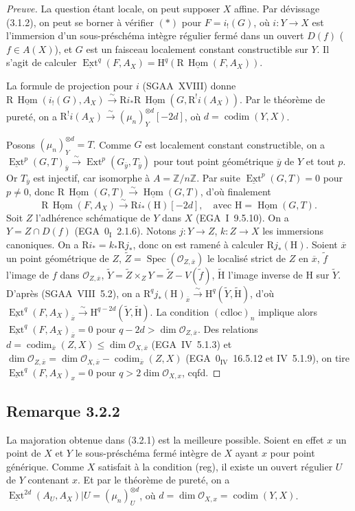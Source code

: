 \documentclass[11pt]{article}
\DeclareMathOperator{\codim}{codim}
\providecommand{\cO}{\mathcal{O}}
\providecommand{\wt}[1]{\widetilde{#1}}
\renewcommand{\H}{\mathrm{H}}
\DeclareMathOperator{\Hom}{Hom}
\DeclareMathOperator{\Ext}{Ext}
\DeclareMathOperator{\Spec}{Spec}
\newcommand{\R}{\mathrm{R}}
\newcommand{\Z}{\mathbb{Z}}
\newcommand{\ol}[1]{\overline{#1}}
\providecommand{\Hom}{\operatorname{Hom}}
\providecommand{\R}{\mathrm R}
\providecommand{\Z}{\mathbb Z}
\providecommand{\Spec}{\operatorname{Spec}}
\providecommand{\Spec}{\operatorname{Spec}}
\providecommand{\Hom}{\operatorname{Hom}}
\providecommand{\Spec}{\operatorname{Spec}}
\providecommand{\Spec}{\operatorname{Spec}}
\begin{document}
\begin{proof}[Preuve]
La question étant locale, on peut supposer $X$ affine. Par dévissage (3.1.2), on peut se borner à vérifier $(*)$ pour $F = i_{!}(G)$, où $i : Y \to X$ est l'immersion d'un sous-préschéma intègre régulier fermé dans un ouvert $D(f)$ ($f \in A(X)$), et $G$ est un faisceau localement constant constructible sur $Y$. Il s'agit de calculer $\underline{\Ext}^q(F, A_X) = \H^q(\R\,\underline{\Hom}(F, A_X))$.

La formule de projection pour $i$ (SGAA~XVIII) donne $\R\,\underline{\Hom}(i_{!}(G), A_X) \xrightarrow{\sim} \R i_{*} \R\,\underline{\Hom}(G, \R^{!}i(A_X))$. Par le théorème de pureté, on a $\R^{!}i(A_X) \xrightarrow{\sim} (\mu_n)^{\otimes d}_Y[-2d]$, où $d = \codim(Y,X)$.

Posons $(\mu_n)^{\otimes d}_Y = T$. Comme $G$ est localement constant constructible, on a $\underline{\Ext}^p(G,T)_{\ol{y}} \xrightarrow{\sim} \Ext^p(G_{\ol{y}}, T_{\ol{y}})$ pour tout point géométrique $\ol{y}$ de $Y$ et tout $p$. Or $T_{\ol{y}}$ est injectif, car isomorphe à $A = \Z/n\Z$. Par suite $\underline{\Ext}^p(G,T) = 0$ pour $p \neq 0$, donc $\R\,\underline{\Hom}(G,T) \xrightarrow{\sim} \underline{\Hom}(G,T)$, d'où finalement
\[
\R\,\underline{\Hom}(F, A_X) \xrightarrow{\sim} \R i_{*}(\H)[-2d], \quad \text{avec } \H = \underline{\Hom}(G,T).
\]
Soit $Z$ l'adhérence schématique de $Y$ dans $X$ (EGA~I~9.5.10). On a $Y = Z \cap D(f)$ (EGA~$0_{\mathrm{I}}$~2.1.6). Notons $j : Y \to Z$, $k : Z \to X$ les immersions canoniques. On a $\R i_{*} = k_{*} \R j_{*}$, donc on est ramené à calculer $\R j_{*}(\H)$. Soient $\ol{x}$ un point géométrique de $Z$, $\wt{Z} = \Spec(\cO_{Z,\ol{x}})$ le localisé strict de $Z$ en $\ol{x}$, $\wt{f}$ l'image de $f$ dans $\cO_{Z,\ol{x}}$, $\wt{Y} = \wt{Z} \times_Z Y = \wt{Z} - V(\wt{f})$, $\wt{\H}$ l'image inverse de $\H$ sur $\wt{Y}$. D'après (SGAA~VIII~5.2), on a $\R^q j_{*}(\H)_{\ol{x}} \xrightarrow{\sim} \H^q(\wt{Y}, \wt{\H})$, d'où $\underline{\Ext}^q(F, A_X)_{\ol{x}} \xrightarrow{\sim} \H^{q-2d}(\wt{Y}, \wt{\H})$. La condition $(\mathrm{cdloc})_n$ implique alors $\underline{\Ext}^q(F, A_X)_{\ol{x}} = 0$ pour $q - 2d > \dim \cO_{Z,\ol{x}}$. Des relations $d = \codim_{\ol{x}}(Z,X) \leqslant \dim \cO_{X,\ol{x}}$ (EGA~IV~5.1.3) et $\dim \cO_{Z,\ol{x}} = \dim \cO_{X,\ol{x}} - \codim_{\ol{x}}(Z,X)$ (EGA~$0_{\mathrm{IV}}$~16.5.12 et IV~5.1.9), on tire $\underline{\Ext}^q(F, A_X)_x = 0$ pour $q > 2\dim \cO_{X,x}$, cqfd.
\end{proof}

\subsection*{Remarque 3.2.2}
La majoration obtenue dans (3.2.1) est la meilleure possible. Soient en effet $x$ un point de $X$ et $Y$ le sous-préschéma fermé intègre de $X$ ayant $x$ pour point générique. Comme $X$ satisfait à la condition (reg), il existe un ouvert régulier $U$ de $Y$ contenant $x$. Et par le théorème de pureté, on a $\underline{\Ext}^{2d}(A_U, A_X)|U = (\mu_n)^{\otimes d}_U$, où $d = \dim \cO_{X,x} = \codim(Y,X)$.
\end{document}
